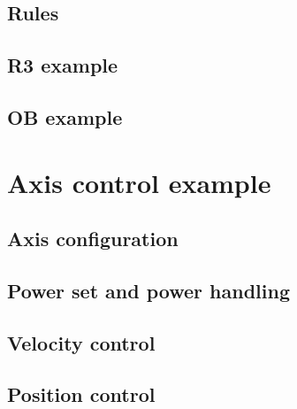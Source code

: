 %	
\subsection{Rules}

%	
\subsection{R3 example}

%	
\subsection{OB example}


\section{Axis control example}

%	
\subsection{Axis configuration}

%	
\subsection{Power set and power handling}

%	
\subsection{Velocity control}

%	
\subsection{Position control}




